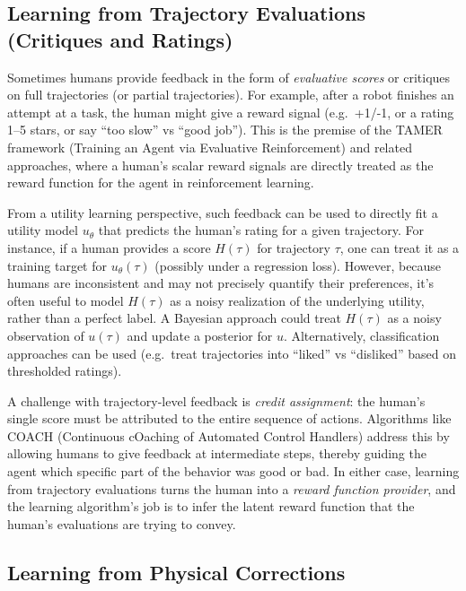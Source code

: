 \documentclass[
  letterpaper,
  numbers=noenddot,
  DIV=11]{scrreprt}
\theoremstyle{plain}
\theoremstyle{definition}
\theoremstyle{remark}
\begin{document}
\subsection*{Learning from Trajectory Evaluations (Critiques and
Ratings)}\label{learning-from-trajectory-evaluations-critiques-and-ratings}

Sometimes humans provide feedback in the form of \emph{evaluative
scores} or critiques on full trajectories (or partial trajectories). For
example, after a robot finishes an attempt at a task, the human might
give a reward signal (e.g.~+1/-1, or a rating 1--5 stars, or say ``too
slow'' vs ``good job''). This is the premise of the TAMER framework
(Training an Agent via Evaluative Reinforcement) and related approaches,
where a human's scalar reward signals are directly treated as the reward
function for the agent in reinforcement learning.

From a utility learning perspective, such feedback can be used to
directly fit a utility model \(u_\theta\) that predicts the human's
rating for a given trajectory. For instance, if a human provides a score
\(H(\tau)\) for trajectory \(\tau\), one can treat it as a training
target for \(u_\theta(\tau)\) (possibly under a regression loss).
However, because humans are inconsistent and may not precisely quantify
their preferences, it's often useful to model \(H(\tau)\) as a noisy
realization of the underlying utility, rather than a perfect label. A
Bayesian approach could treat \(H(\tau)\) as a noisy observation of
\(u(\tau)\) and update a posterior for \(u\). Alternatively,
classification approaches can be used (e.g.~treat trajectories into
``liked'' vs ``disliked'' based on thresholded ratings).

A challenge with trajectory-level feedback is \emph{credit assignment}:
the human's single score must be attributed to the entire sequence of
actions. Algorithms like COACH (Continuous cOaching of Automated Control
Handlers) address this by allowing humans to give feedback at
intermediate steps, thereby guiding the agent which specific part of the
behavior was good or bad. In either case, learning from trajectory
evaluations turns the human into a \emph{reward function provider}, and
the learning algorithm's job is to infer the latent reward function that
the human's evaluations are trying to convey.

\subsection*{Learning from Physical
Corrections}\label{learning-from-physical-corrections}
\end{document}
